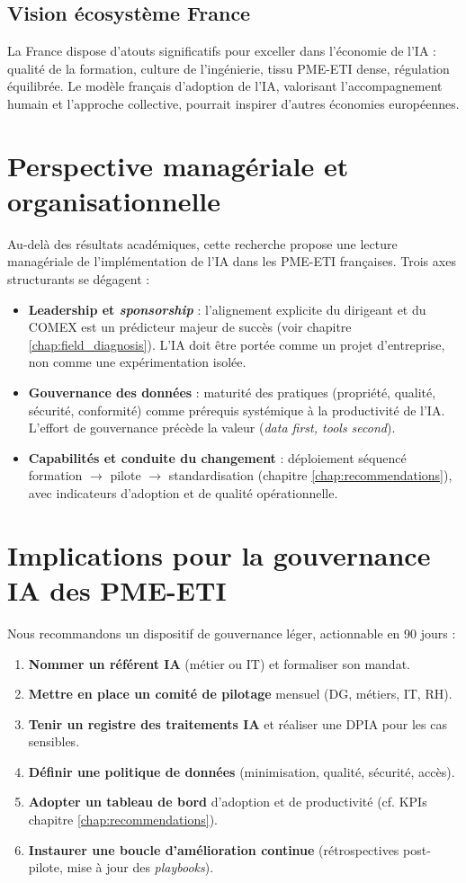 \subsection{Vision écosystème France}
La France dispose d’atouts significatifs pour exceller dans l’économie de l’IA : qualité de la formation, culture de l’ingénierie, tissu PME-ETI dense, régulation équilibrée. Le modèle français d’adoption de l’IA, valorisant l’accompagnement humain et l’approche collective, pourrait inspirer d’autres économies européennes.

\section{Perspective managériale et organisationnelle}
Au-delà des résultats académiques, cette recherche propose une lecture managériale de l’implémentation de l’IA dans les PME-ETI françaises. Trois axes structurants se dégagent :
\begin{itemize}
    \item \textbf{Leadership et \textit{sponsorship}} : l’alignement explicite du dirigeant et du COMEX est un prédicteur majeur de succès (voir chapitre \ref{chap:field_diagnosis}). L’IA doit être portée comme un projet d’entreprise, non comme une expérimentation isolée.
    \item \textbf{Gouvernance des données} : maturité des pratiques (propriété, qualité, sécurité, conformité) comme prérequis systémique à la productivité de l’IA. L’effort de gouvernance précède la valeur (\textit{data first, tools second}).
    \item \textbf{Capabilités et conduite du changement} : déploiement séquencé formation $\rightarrow$ pilote $\rightarrow$ standardisation (chapitre \ref{chap:recommendations}), avec indicateurs d’adoption et de qualité opérationnelle.
\end{itemize}

\section{Implications pour la gouvernance IA des PME-ETI}
Nous recommandons un dispositif de gouvernance léger, actionnable en 90 jours :
\begin{enumerate}
    \item \textbf{Nommer un référent IA} (métier ou IT) et formaliser son mandat.
    \item \textbf{Mettre en place un comité de pilotage} mensuel (DG, métiers, IT, RH).
    \item \textbf{Tenir un registre des traitements IA} et réaliser une DPIA pour les cas sensibles.
    \item \textbf{Définir une politique de données} (minimisation, qualité, sécurité, accès).
    \item \textbf{Adopter un tableau de bord} d’adoption et de productivité (cf. KPIs chapitre \ref{chap:recommendations}).
    \item \textbf{Instaurer une boucle d’amélioration continue} (rétrospectives post-pilote, mise à jour des \textit{playbooks}).
\end{enumerate}

